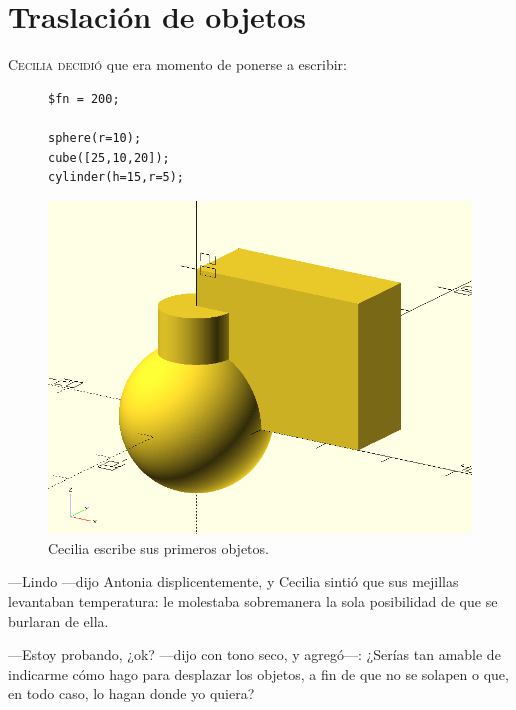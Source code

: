
\chapter{Traslación de objetos}

\lettrine[lines=1]{C}{ecilia decidió} que era momento de ponerse a
escribir:

\begin{figure}[ht]
  \begin{minipage}[]{.4\textwidth}
    \begin{lstlisting}
$fn = 200;

sphere(r=10);
cube([25,10,20]);
cylinder(h=15,r=5);
    \end{lstlisting}%
  \end{minipage}\hfill
   \begin{minipage}[]{.6\textwidth}
     \centering
     \includegraphics[width=.95\textwidth]{imagenes/esfera-cubo-cilindro-1}
   \end{minipage}
     \caption{Cecilia escribe sus primeros objetos.}
  \label{fig:esfera-cubo-cilindro-1}
\end{figure}



---Lindo ---dijo Antonia displicentemente, y Cecilia sintió que sus
mejillas levantaban temperatura: le molestaba sobremanera la sola
posibilidad de que se burlaran de ella.

---Estoy probando, ¿ok? ---dijo con tono seco, y a\-gre\-gó---:
¿Serías tan amable de indicarme cómo hago para desplazar los
objetos, a fin de que no se solapen o que, en todo caso, lo hagan
donde yo quiera?

